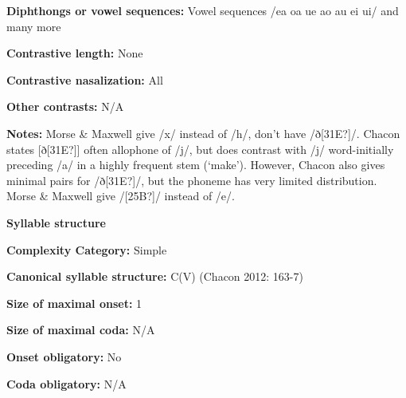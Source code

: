 \begin{styleBody}
\textbf{Diphthongs or vowel sequences:} Vowel sequences /ea oa ue ao au ei ui/ and many more
\end{styleBody}

\begin{styleBody}
\textbf{Contrastive length:} None
\end{styleBody}

\begin{styleBody}
\textbf{Contrastive nasalization:} All
\end{styleBody}

\begin{styleBody}
\textbf{Other contrasts:} N/A
\end{styleBody}

\begin{styleBody}
\textbf{Notes:} Morse \& Maxwell give /x/ instead of /h/, don’t have /ð[31E?]/. Chacon states [ð[31E?]] often allophone of /j/, but does contrast with /j/ word-initially preceding /a/ in a highly frequent stem (‘make’). However, Chacon also gives minimal pairs for /ð[31E?]/, but the phoneme has very limited distribution. Morse \& Maxwell give /[25B?]/ instead of /e/.
\end{styleBody}

\begin{styleBody}
\textbf{Syllable structure}
\end{styleBody}

\begin{styleBody}
\textbf{Complexity Category:} Simple
\end{styleBody}

\begin{styleBody}
\textbf{Canonical syllable structure:} C(V) (Chacon 2012: 163-7)
\end{styleBody}

\begin{styleBody}
\textbf{Size of maximal onset:} 1
\end{styleBody}

\begin{styleBody}
\textbf{Size of maximal coda:} N/A
\end{styleBody}

\begin{styleBody}
\textbf{Onset obligatory:} No
\end{styleBody}

\begin{styleBody}
\textbf{Coda obligatory:} N/A
\end{styleBody}

